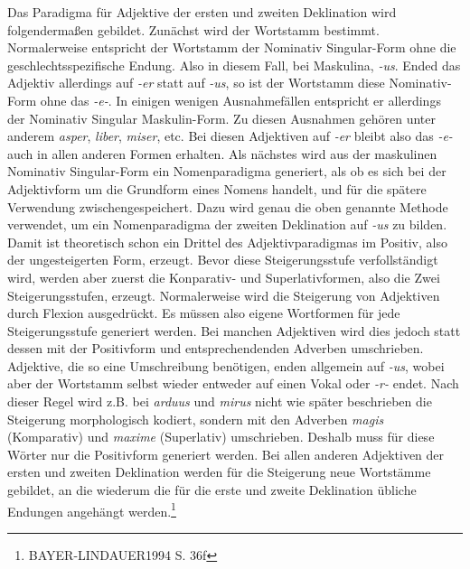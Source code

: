 \documentclass[12pt,abstract=on,titlepage,bibliography=totoc,ngerman,listof=totoc]{scrreprt}
\begin{document}
Das Paradigma für Adjektive der ersten und zweiten Deklination wird folgendermaßen gebildet. Zunächst wird der Wortstamm bestimmt. Normalerweise entspricht der Wortstamm der Nominativ Singular-Form ohne die geschlechtsspezifische Endung. Also in diesem Fall, bei Maskulina, \textit{-us}. Ended das Adjektiv allerdings auf \textit{-er} statt auf \textit{-us}, so ist der Wortstamm diese Nominativ-Form ohne das \textit{-e-}. In einigen wenigen Ausnahmefällen entspricht er allerdings der Nominativ Singular Maskulin-Form. Zu diesen Ausnahmen gehören unter anderem \textit{asper}, \textit{liber}, \textit{miser}, etc. Bei diesen Adjektiven auf \textit{-er} bleibt also das \textit{-e-} auch in allen anderen Formen erhalten. Als nächstes wird aus der maskulinen Nominativ Singular-Form ein Nomenparadigma generiert, als ob es sich bei der Adjektivform um die Grundform eines Nomens handelt, und für die spätere Verwendung zwischengespeichert. Dazu wird genau die oben genannte Methode verwendet, um ein Nomenparadigma der zweiten Deklination auf \textit{-us} zu bilden. Damit ist theoretisch schon ein Drittel des Adjektivparadigmas im Positiv, also der ungesteigerten Form, erzeugt. Bevor diese Steigerungsstufe verfollständigt wird, werden aber zuerst die Konparativ- und Superlativformen, also die Zwei Steigerungsstufen, erzeugt. Normalerweise wird die Steigerung von Adjektiven durch Flexion ausgedrückt. Es müssen also eigene Wortformen für jede Steigerungsstufe generiert werden. Bei manchen Adjektiven wird dies jedoch statt dessen mit der Positivform und entsprechendenden Adverben umschrieben. Adjektive, die so eine Umschreibung benötigen, enden allgemein auf \textit{-us}, wobei aber der Wortstamm selbst wieder entweder auf einen Vokal oder \textit{-r-} endet. Nach dieser Regel wird z.B. bei \textit{arduus} und \textit{mirus} nicht wie später beschrieben die Steigerung morphologisch kodiert, sondern mit den Adverben \textit{magis} (Komparativ) und \textit{maxime} (Superlativ) umschrieben. Deshalb muss für diese Wörter nur die Positivform generiert werden. Bei allen anderen Adjektiven der ersten und zweiten Deklination werden für die Steigerung neue Wortstämme gebildet, an die wiederum die für die erste und zweite Deklination übliche Endungen angehängt werden.\footnote{BAYER-LINDAUER1994 S. 36f} \par
\end{document}
